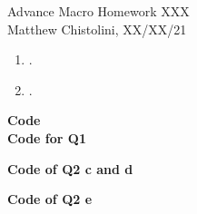 \documentclass[12pt,oneside,reqno]{amsart}
\begin{document}
\begin{center}
    \Huge{Advance Macro Homework XXX}\\
    \large{Matthew Chistolini, XX/XX/21}
\end{center}
\vspace{-.3cm}
\begin{enumerate}
\item . \\
    
\item .\\
    
\end{enumerate}
{\bf Code}\\
\textbf{Code for Q1}




\textbf{Code of Q2 c and d}


\textbf{Code of Q2 e}



% 
\end{document}
